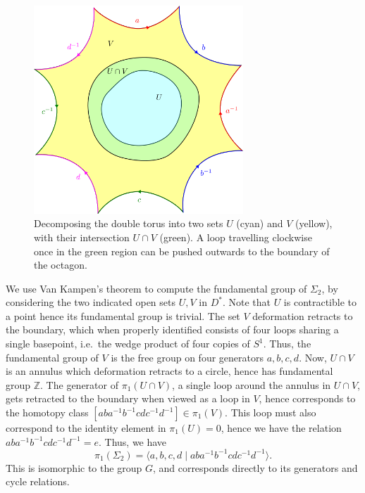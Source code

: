 \documentclass[12pt]{article}
\newcommand{\Z}{\mathbb{Z}}
\theoremstyle{definition}
\theoremstyle{remark}
\begin{document}
    \begin{figure}[H]
        \begin{center}
            \includegraphics[width=0.7\textwidth]{figures/van_kampen.png}
        \end{center}
        \caption{Decomposing the double torus into two sets $U$ (cyan) and $V$
        (yellow), with their intersection $U \cap V$ (green). A loop
        travelling clockwise once in the green region can be pushed outwards to the
        boundary of the octagon.}
        \label{fig:van_kampen}
    \end{figure}


    We use Van Kampen's theorem to compute the fundamental group of $\Sigma_2$, by
    considering the two indicated open sets $U, V$ in $D^*$. Note that $U$ is
    contractible to a point hence its fundamental group is trivial. The set $V$
    deformation retracts to the boundary, which when properly identified consists of
    four loops sharing a single basepoint, i.e.\ the wedge product of four copies of
    $S^1$. Thus, the fundamental group of $V$ is the free group on four generators
    $a, b, c, d$.  Now, $U \cap V$ is an annulus which deformation retracts to a
    circle, hence has fundamental group $\Z$. The generator of $\pi_1(U \cap V)$, a
    single loop around the annulus in $U \cap V$, gets retracted to the boundary when
    viewed as a loop in $V$, hence corresponds to the homotopy class
    $[aba^{-1}b^{-1}cdc^{-1}d^{-1}] \in \pi_1(V)$. This loop must also correspond to
    the identity element in $\pi_1(U) = 0$, hence we have the relation
    $aba^{-1}b^{-1}cdc^{-1}d^{-1} = e$. Thus, we have \[
        \pi_1(\Sigma_2) = \langle a, b, c, d \mid
        aba^{-1}b^{-1}cdc^{-1}d^{-1}\rangle.
    \] This is isomorphic to the group $G$, and corresponds directly to its
    generators and cycle relations.
\end{document}
